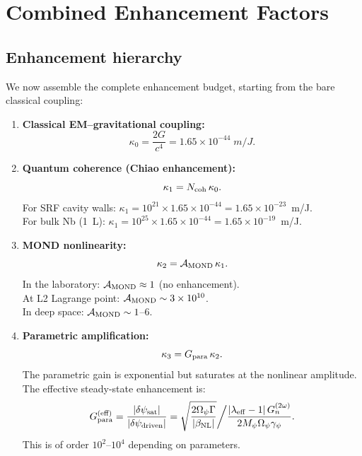 \documentclass[12pt,aps,prd,twocolumn,superscriptaddress,nofootinbib]{revtex4-2}
\newcommand{\lam}{\lambda}
\newcommand{\Mpsi}{M_\psi}
\newcommand{\Opsi}{\Omega_\psi}
\newcommand{\gpsi}{\gamma_\psi}
\newcommand{\ee}[1]{\times 10^{#1}}
\begin{document}
\section{Combined Enhancement Factors}
\label{sec:budget}

\subsection{Enhancement hierarchy}

We now assemble the complete enhancement budget, starting from the
bare classical coupling:

\begin{enumerate}
\item \textbf{Classical EM--gravitational coupling:}
\begin{equation}
\kappa_0 = \frac{2G}{c^4} = 1.65\ee{-44}\;\si{m/J}.
\end{equation}

\item \textbf{Quantum coherence (Chiao enhancement):}
\begin{equation}
\kappa_1 = N_{\rm coh}\,\kappa_0.
\end{equation}
For SRF cavity walls: $\kappa_1 = 10^{21}\times 1.65\ee{-44}
= 1.65\ee{-23}$~m/J.\\
For bulk Nb (1~L): $\kappa_1 = 10^{25}\times 1.65\ee{-44}
= 1.65\ee{-19}$~m/J.

\item \textbf{MOND nonlinearity:}
\begin{equation}
\kappa_2 = \mathcal{A}_{\rm MOND}\,\kappa_1.
\end{equation}
In the laboratory: $\mathcal{A}_{\rm MOND} \approx 1$ (no enhancement).\\
At L2 Lagrange point: $\mathcal{A}_{\rm MOND} \sim 3\ee{10}$.\\
In deep space: $\mathcal{A}_{\rm MOND} \sim 1$--$6$.

\item \textbf{Parametric amplification:}
\begin{equation}
\kappa_3 = G_{\rm para}\,\kappa_2.
\end{equation}
The parametric gain is exponential but saturates at the nonlinear
amplitude. The effective steady-state enhancement is:
\begin{equation}
G_{\rm para}^{(\rm eff)} = \frac{|\delta\psi_{\rm sat}|}
{|\delta\psi_{\rm driven}|}
= \sqrt{\frac{2\Opsi\Gamma}{|\beta_{\rm NL}|}}
\bigg/\frac{|\lam_{\rm eff}-1|\,G_n^{(2\omega)}}
{2\Mpsi\Opsi\gpsi}.
\end{equation}
This is of order $10^2$--$10^4$ depending on parameters.

\end{enumerate}
\end{document}
